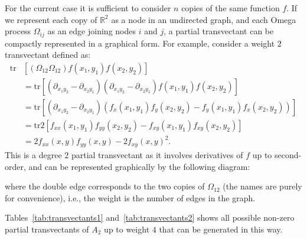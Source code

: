 \documentclass[review,onefignum,onetabnum]{siamonline190516}
\begin{document}
For the current case it is sufficient to consider $n$ copies of the same
function $f$. If we represent each copy of $\mathbb{R}^2$ as a node in an
undirected graph, and each Omega process $\Omega_{ij}$ as an edge joining
nodes $i$ and $j$, a partial transvectant can be compactly represented in a
graphical form. For example, consider a weight $2$ transvectant defined as:
\begin{align*}
    \mbox{tr} &\left[(\Omega_{12}\Omega_{12}) f(x_1, y_1)f(x_2, y_2)\right] \\
    &= \mbox{tr}\left[(\partial_{x_1 y_2} - \partial_{x_2y_1})(\partial_{x_1 y_2} -
    \partial_{x_2y_1})f(x_1, y_1)f(x_2, y_2)\right]\\
    &= \mbox{tr}\left[\left(\partial_{x_1 y_2} - \partial_{x_2 y_1}\right)\left(f_x(x_1, y_1)f_y(x_2, y_2) - f_y(x_1, y_1)f_x(x_2, y_2)\right)\right] \\
    &= \mbox{tr} 2 \left[f_{xx}(x_1, y_1)f_{yy}(x_2, y_2) - f_{xy}(x_1, y_1)f_{xy}(x_2, y_2)\right] \\
    &= 2 f_{xx}(x, y) f_{yy}(x, y) - 2 f_{xy}(x, y)^2.
\end{align*}
This is a degree $2$ partial transvectant as it involves derivatives of $f$
up to second-order, and can be represented graphically by the following
diagram:
\begin{center}
\end{center}
where the double edge corresponds to the two copies of $\Omega_{12}$ (the names are purely for convenience), i.e.,
the weight is the number of edges in the graph.

Tables~\ref{tab:transvectants1} and~\ref{tab:transvectants2} shows all possible non-zero partial
transvectants of $A_2$ up to weight $4$ that can be generated in this way.
\end{document}
